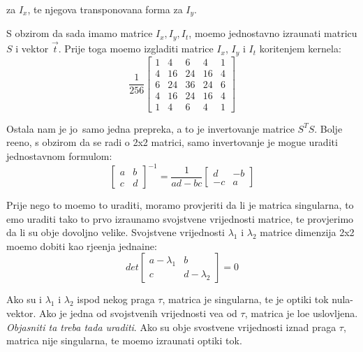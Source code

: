 za $I_x$, te njegova transponovana forma za $I_y$.

S obzirom da sada imamo matrice $I_x,I_y,I_t$, mo\zh emo jednostavno izra\ch unati matricu $S$ i vektor $\vec{t}$. Prije toga mo\zh emo izgladiti matrice $I_x$, $I_y$ i $I_t$ kori\sh tenjem kernela:
\[
\frac{1}{256}
\begin{bmatrix}
1 & 4 & 6 & 4 & 1 \\
4 & 16 & 24 & 16 & 4 \\
6 & 24 & 36 & 24 & 6 \\
4 & 16 & 24 & 16 & 4 \\
1 & 4 & 6 & 4 & 1
\end{bmatrix}
\]

Ostala nam je jo\sh\ samo jedna prepreka, a to je invertovanje matrice $S^TS$. Bolje re\ch eno, s obzirom da se radi o 2x2 matrici, samo invertovanje je mogu\cj e uraditi jednostavnom formulom:
\[
\begin{bmatrix}
a & b \\
c & d
\end{bmatrix}^{-1}
=\frac{1}{ad-bc}
\begin{bmatrix}
d & -b \\
-c & a
\end{bmatrix}
\]

Prije nego \sh to mo\zh emo to uraditi, moramo provjeriti da li je matrica singularna, \sh to \cj emo uraditi tako \sh to prvo izra\ch unamo svojstvene vrijednosti matrice, te provjerimo da li su obje
dovoljno velike. Svojstvene vrijednosti $\lambda_1$ i $\lambda_2$ matrice dimenzija 2x2 mo\zh emo dobiti kao rje\sh enja jedna\ch ine:
\[
det
\begin{bmatrix}
a-\lambda_1 & b \\
c & d-\lambda_2
\end{bmatrix}
=0
\]

Ako su i $\lambda_1$ i $\lambda_2$ ispod nekog praga $\tau$, matrica je singularna, te je opti\ch ki tok nula-vektor. Ako je jedna od svojstvenih vrijednosti ve\cj a od $\tau$, matrica je lo\sh e uslovljena.
\textit{Objasniti \sh ta treba tada uraditi}. Ako su obje svostvene vrijednosti iznad praga $\tau$, matrica nije singularna, te mo\zh emo izra\ch unati opti\ch ki tok.

